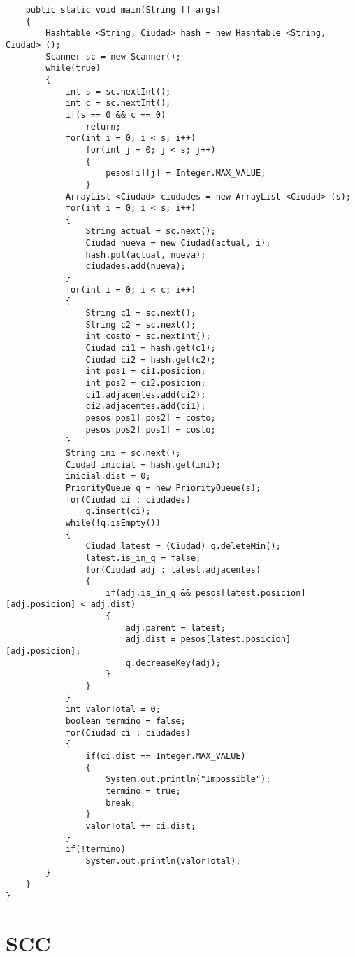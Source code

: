 \documentclass[a4paper, 11pt, oneside]{report}
\begin{document}
\begin{verbatim}
	public static void main(String [] args)
	{
		Hashtable <String, Ciudad> hash = new Hashtable <String, Ciudad> ();
		Scanner sc = new Scanner();
		while(true)
		{
			int s = sc.nextInt();
			int c = sc.nextInt();
			if(s == 0 && c == 0)
				return;
			for(int i = 0; i < s; i++)
				for(int j = 0; j < s; j++)
				{
					pesos[i][j] = Integer.MAX_VALUE;
				}
			ArrayList <Ciudad> ciudades = new ArrayList <Ciudad> (s);
			for(int i = 0; i < s; i++)
			{
				String actual = sc.next();
				Ciudad nueva = new Ciudad(actual, i);
				hash.put(actual, nueva);
				ciudades.add(nueva);
			}
			for(int i = 0; i < c; i++)
			{
				String c1 = sc.next();
				String c2 = sc.next();
				int costo = sc.nextInt();
				Ciudad ci1 = hash.get(c1);
				Ciudad ci2 = hash.get(c2);
				int pos1 = ci1.posicion;
				int pos2 = ci2.posicion;
				ci1.adjacentes.add(ci2);
				ci2.adjacentes.add(ci1);
				pesos[pos1][pos2] = costo;
				pesos[pos2][pos1] = costo;
			}
			String ini = sc.next();
			Ciudad inicial = hash.get(ini);
			inicial.dist = 0;
			PriorityQueue q = new PriorityQueue(s);
			for(Ciudad ci : ciudades)
				q.insert(ci);
			while(!q.isEmpty())
			{
				Ciudad latest = (Ciudad) q.deleteMin();
				latest.is_in_q = false;
				for(Ciudad adj : latest.adjacentes)
				{
					if(adj.is_in_q && pesos[latest.posicion][adj.posicion] < adj.dist)
					{
						adj.parent = latest;
						adj.dist = pesos[latest.posicion][adj.posicion];
						q.decreaseKey(adj);
					}				
				}
			}
			int valorTotal = 0;
			boolean termino = false;
			for(Ciudad ci : ciudades)
			{
				if(ci.dist == Integer.MAX_VALUE)
				{
					System.out.println("Impossible");
					termino = true;
					break;
				}
				valorTotal += ci.dist;
			}
			if(!termino)
				System.out.println(valorTotal);
		}
	}
}

\end{verbatim}

\section{SCC}
\end{document}

